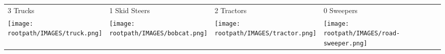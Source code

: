 \begin{tabular}{m{}m{}m{}m{}}
    {\color{ccorange} 3 Trucks} & {\color{ccorange} 1 Skid Steers} & {\color{ccorange} 2 Tractors} & {\color{ccorange} 0 Sweepers} \\
    \texttt{[image: \\rootpath/IMAGES/truck.png]}  & \texttt{[image: \\rootpath/IMAGES/bobcat.png]} & \texttt{[image: \\rootpath/IMAGES/tractor.png]} & \texttt{[image: \\rootpath/IMAGES/road-sweeper.png]}                         
    \end{tabular}